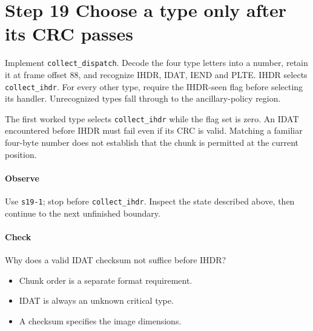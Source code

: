 \section{Step 19 Choose a type only after its CRC passes}\label{png-collect-s19}
Implement \texttt{collect\_dispatch}. Decode the four type letters into a number, retain it at frame offset 88, and recognize IHDR, IDAT, IEND and PLTE. IHDR selects \texttt{collect\_ihdr}. For every other type, require the IHDR-seen flag before selecting its handler. Unrecognized types fall through to the ancillary-policy region.

The first worked type selects \texttt{collect\_ihdr} while the flag set is zero. An IDAT encountered before IHDR must fail even if its CRC is valid. Matching a familiar four-byte number does not establish that the chunk is permitted at the current position.

\paragraph{Observe} Use \texttt{s19-1}; stop before \texttt{collect\_ihdr}. Inspect the state described above, then continue to the next unfinished boundary.

\paragraph{Check} Why does a valid IDAT checksum not suffice before IHDR?
\begin{itemize}
  \item[A.] Chunk order is a separate format requirement.
  \item[B.] IDAT is always an unknown critical type.
  \item[C.] A checksum specifies the image dimensions.
\end{itemize}
